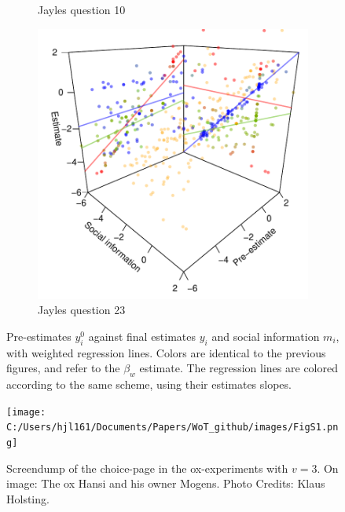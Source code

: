 \documentclass[9pt,twoside,lineno]{pnas-new}
\begin{document}
\begin{figure}[htbp]
\begin{subfigure}[b]{.24\textwidth}
		\caption{Jayles question 10}
	\end{subfigure}
	\begin{subfigure}[b]{.24\textwidth}
		\includegraphics[width=\textwidth]{../plots/jayles23_vs_xp3d.pdf}
		\caption{Jayles question 23}
	\end{subfigure}
	\caption{Pre-estimates $y_i^0$ against final estimates $y_i$ and social information $m_i$, with weighted regression lines. Colors are identical to the previous figures, and refer to the $\beta_w$ estimate. The regression lines are colored according to the same scheme, using their estimates slopes.}\label{fig: Jayles 3d}
\end{figure}

















\begin{figure}
\centering
\texttt{[image: C:/Users/hjl161/Documents/Papers/WoT\_github/images/FigS1.png]}
\caption{Screendump of the choice-page in the ox-experiments with $v=3$. On image: The ox Hansi and his owner Mogens. Photo Credits: Klaus Holsting.}
\end{figure}
\end{document}
